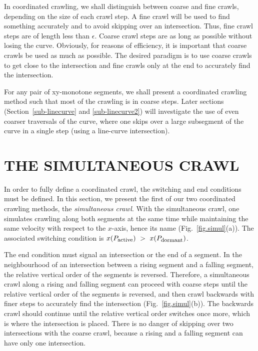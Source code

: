 In coordinated crawling, we shall distinguish between coarse and fine crawls, depending on
the size of each crawl step.
A fine crawl will be used to find something accurately and to avoid skipping over an intersection.
Thus, fine crawl steps are of length less than $\epsilon$.
Coarse crawl steps are as long as possible without losing the curve.
Obviously, for reasons of efficiency, it is important that coarse crawls be used as much as 
possible.
The desired paradigm is to use coarse crawls to get close to the intersection and 
fine crawls only at the end to accurately find the intersection.

For any pair of xy-monotone segments, we shall present a coordinated crawling method such 
that most of the crawling is in coarse steps.
Later sections (Section~\ref{sub-linecurve} and \ref{sub-linecurve2}) will investigate 
the use 
of even coarser traversals of the curve, where one skips over a large subsegment of 
the curve in a single step (using a line-curve intersection).

\section{THE SIMULTANEOUS CRAWL}
\label{sec-simul}

In order to fully define a coordinated crawl, the switching and end conditions must be defined.
In this section, we present the first of our two coordinated crawling methods, the 
{\em simultaneous crawl}.
With the simultaneous crawl, one simulates crawling along both 
segments at the same time while maintaining the same velocity with respect to the $x$-axis,
hence its name (Fig.~\ref{fig.simul}(a)).
The associated switching condition is 
$ x(P_{\mbox{\footnotesize{active}}})\ >\ x(P_{\mbox{\footnotesize{dormant}}}) $.


The end condition must signal an intersection or the end of a segment.
In the neighbourhood of an intersection between a rising segment and a falling segment, 
the relative vertical order of the segments is reversed.
Therefore, a simultaneous crawl along a rising and falling segment can proceed with coarse steps 
until the relative vertical order of the segments is reversed, and then crawl backwards
with finer steps to accurately find the intersection 
(Fig.~\ref{fig.simul}(b)).
The backwards
	crawl should continue until the relative vertical order switches once more, which 
	is where the intersection is placed.
There is no danger of skipping over two intersections with the coarse crawl, because
a rising and a falling segment can have only one intersection.

